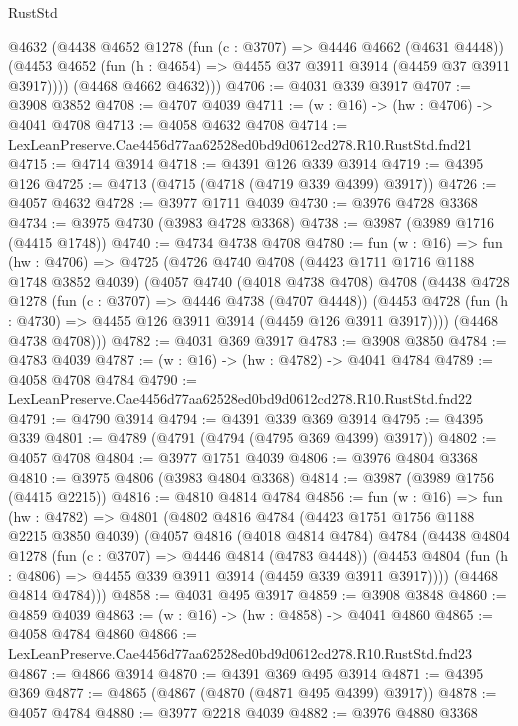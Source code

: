 \begin{lexlean}{RustStd}
\begin{coremodule}
        @4632
        (@4438
          @4652
          @1278
          (fun (c : @3707) => @4446 @4662 (@4631 @4448))
          (@4453 @4652 (fun (h : @4654) => @4455 @37 @3911 @3914 (@4459 @37 @3911 @3917))))
        (@4468 @4662 @4632)))
@4706 := @4031 @339 @3917
@4707 := @3908 @3852
@4708 := @4707 @4039
@4711 := (w : @16) -> (hw : @4706) -> @4041 @4708
@4713 := @4058 @4632 @4708
@4714 := LexLeanPreserve.Cae4456d77aa62528ed0bd9d0612cd278.R10.RustStd.fnd21
@4715 := @4714 @3914
@4718 := @4391 @126 @339 @3914
@4719 := @4395 @126
@4725 := @4713 (@4715 (@4718 (@4719 @339 @4399) @3917))
@4726 := @4057 @4632
@4728 := @3977 @1711 @4039
@4730 := @3976 @4728 @3368
@4734 := @3975 @4730 (@3983 @4728 @3368)
@4738 := @3987 (@3989 @1716 (@4415 @1748))
@4740 := @4734 @4738 @4708
@4780 := fun (w : @16) =>
  fun (hw : @4706) =>
  @4725
    (@4726
      @4740
      @4708
      (@4423 @1711 @1716 @1188 @1748 @3852 @4039)
      (@4057
        @4740
        (@4018 @4738 @4708)
        @4708
        (@4438
          @4728
          @1278
          (fun (c : @3707) => @4446 @4738 (@4707 @4448))
          (@4453 @4728 (fun (h : @4730) => @4455 @126 @3911 @3914 (@4459 @126 @3911 @3917))))
        (@4468 @4738 @4708)))
@4782 := @4031 @369 @3917
@4783 := @3908 @3850
@4784 := @4783 @4039
@4787 := (w : @16) -> (hw : @4782) -> @4041 @4784
@4789 := @4058 @4708 @4784
@4790 := LexLeanPreserve.Cae4456d77aa62528ed0bd9d0612cd278.R10.RustStd.fnd22
@4791 := @4790 @3914
@4794 := @4391 @339 @369 @3914
@4795 := @4395 @339
@4801 := @4789 (@4791 (@4794 (@4795 @369 @4399) @3917))
@4802 := @4057 @4708
@4804 := @3977 @1751 @4039
@4806 := @3976 @4804 @3368
@4810 := @3975 @4806 (@3983 @4804 @3368)
@4814 := @3987 (@3989 @1756 (@4415 @2215))
@4816 := @4810 @4814 @4784
@4856 := fun (w : @16) =>
  fun (hw : @4782) =>
  @4801
    (@4802
      @4816
      @4784
      (@4423 @1751 @1756 @1188 @2215 @3850 @4039)
      (@4057
        @4816
        (@4018 @4814 @4784)
        @4784
        (@4438
          @4804
          @1278
          (fun (c : @3707) => @4446 @4814 (@4783 @4448))
          (@4453 @4804 (fun (h : @4806) => @4455 @339 @3911 @3914 (@4459 @339 @3911 @3917))))
        (@4468 @4814 @4784)))
@4858 := @4031 @495 @3917
@4859 := @3908 @3848
@4860 := @4859 @4039
@4863 := (w : @16) -> (hw : @4858) -> @4041 @4860
@4865 := @4058 @4784 @4860
@4866 := LexLeanPreserve.Cae4456d77aa62528ed0bd9d0612cd278.R10.RustStd.fnd23
@4867 := @4866 @3914
@4870 := @4391 @369 @495 @3914
@4871 := @4395 @369
@4877 := @4865 (@4867 (@4870 (@4871 @495 @4399) @3917))
@4878 := @4057 @4784
@4880 := @3977 @2218 @4039
@4882 := @3976 @4880 @3368

\end{coremodule}
\end{lexlean}
